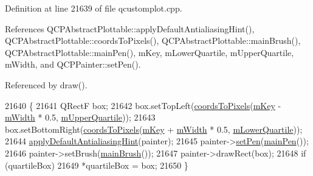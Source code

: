 Definition at line 21639 of file qcustomplot.\+cpp.



References Q\+C\+P\+Abstract\+Plottable\+::apply\+Default\+Antialiasing\+Hint(), Q\+C\+P\+Abstract\+Plottable\+::coords\+To\+Pixels(), Q\+C\+P\+Abstract\+Plottable\+::main\+Brush(), Q\+C\+P\+Abstract\+Plottable\+::main\+Pen(), m\+Key, m\+Lower\+Quartile, m\+Upper\+Quartile, m\+Width, and Q\+C\+P\+Painter\+::set\+Pen().



Referenced by draw().


\begin{DoxyCode}
21640                                                                    \{
21641   QRectF box;
21642   box.setTopLeft(\hyperlink{class_q_c_p_abstract_plottable_ade710a776104b14c1c835168ce1bfc5c}{coordsToPixels}(\hyperlink{class_q_c_p_statistical_box_a86fd1d3be5c5bc11d11eda7517069af4}{mKey} - \hyperlink{class_q_c_p_statistical_box_af365e40b0f706c3d76f857c7957f629d}{mWidth} * 0.5, 
      \hyperlink{class_q_c_p_statistical_box_a865afbcca332ee851aa45807381bc80e}{mUpperQuartile}));
21643   box.setBottomRight(\hyperlink{class_q_c_p_abstract_plottable_ade710a776104b14c1c835168ce1bfc5c}{coordsToPixels}(\hyperlink{class_q_c_p_statistical_box_a86fd1d3be5c5bc11d11eda7517069af4}{mKey} + \hyperlink{class_q_c_p_statistical_box_af365e40b0f706c3d76f857c7957f629d}{mWidth} * 0.5, 
      \hyperlink{class_q_c_p_statistical_box_acac86cac93d9fa3d820b5aaa04ed96f6}{mLowerQuartile}));
21644   \hyperlink{class_q_c_p_abstract_plottable_a76e9d6cc7972dc1528f526d163766aca}{applyDefaultAntialiasingHint}(painter);
21645   painter->\hyperlink{class_q_c_p_painter_af9c7a4cd1791403901f8c5b82a150195}{setPen}(\hyperlink{class_q_c_p_abstract_plottable_a19276ed2382a3a06464417b8788b1451}{mainPen}());
21646   painter->setBrush(\hyperlink{class_q_c_p_abstract_plottable_ae74c123832da180c17e22203e748d9b7}{mainBrush}());
21647   painter->drawRect(box);
21648   \textcolor{keywordflow}{if} (quartileBox)
21649     *quartileBox = box;
21650 \}
\end{DoxyCode}


